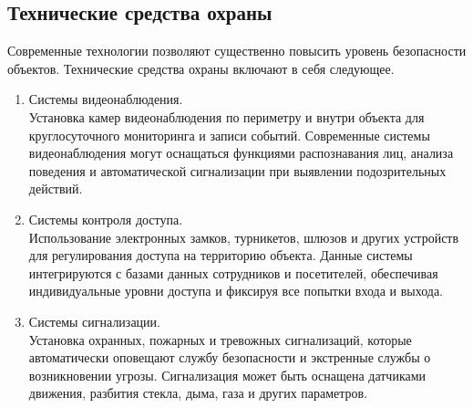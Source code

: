 \subsection{Технические средства охраны}
Современные технологии позволяют существенно повысить уровень безопасности объектов. Технические средства охраны включают в себя следующее.
\begin{enumerate}
    \item Системы видеонаблюдения. \\
    Установка камер видеонаблюдения по периметру и внутри объекта для круглосуточного мониторинга и записи событий. Современные системы видеонаблюдения могут оснащаться функциями распознавания лиц, анализа поведения и автоматической сигнализации при выявлении подозрительных действий.
    \item Системы контроля доступа. \\
    Использование электронных замков, турникетов, шлюзов и других устройств для регулирования доступа на территорию объекта. Данные системы интегрируются с базами данных сотрудников и посетителей, обеспечивая индивидуальные уровни доступа и фиксируя все попытки входа и выхода.
    \item Системы сигнализации. \\
    Установка охранных, пожарных и тревожных сигнализаций, которые автоматически оповещают службу безопасности и экстренные службы о возникновении угрозы. Сигнализация может быть оснащена датчиками движения, разбития стекла, дыма, газа и других параметров.
\end{enumerate}

